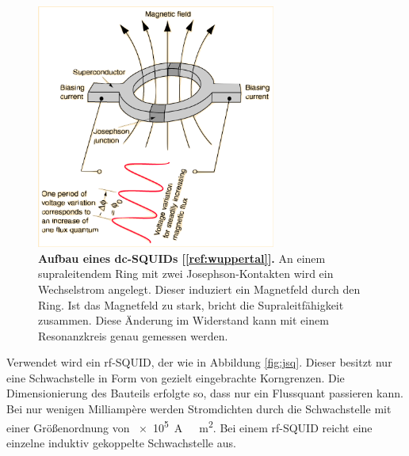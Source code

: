 \documentclass[a4paper,ngerman]{scrartcl}
\begin{document}
\begin{figure}[tb!]
\centering
\includegraphics[width=0.7\textwidth]{abbildungen/squide.png}
\caption[Versuchsplatz]{\textbf{Aufbau eines dc-SQUIDs [\ref{ref:wuppertal}].} An einem supraleitendem Ring mit zwei Josephson-Kontakten wird ein Wechselstrom angelegt. 
Dieser induziert ein Magnetfeld durch den Ring. 
Ist das Magnetfeld zu stark, bricht die Supraleitfähigkeit zusammen.
Diese Änderung im Widerstand kann mit einem Resonanzkreis genau gemessen werden.}
\label{fig:squid_wuppertal}
\end{figure}

Verwendet wird ein rf-SQUID, der wie in Abbildung \ref{fig:jsq}. 
Dieser besitzt nur eine Schwachstelle in Form von gezielt eingebrachte Korngrenzen.
Die Dimensionierung des Bauteils erfolgte so, dass nur ein Flussquant passieren kann.
Bei nur wenigen Milliampère werden Stromdichten durch die Schwachstelle mit einer Größenordnung von \SI{e5}{A \per  \centi \square \meter}.
Bei einem rf-SQUID reicht eine einzelne induktiv gekoppelte Schwachstelle aus.
\end{document}

